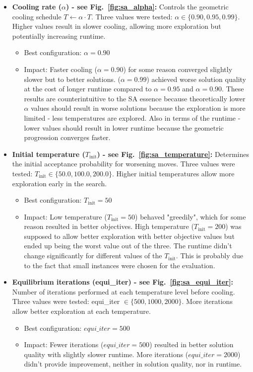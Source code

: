 \documentclass[a4paper]{scrartcl}
\begin{document}
\begin{itemize}
  \item \textbf{Cooling rate ($\alpha$) - see Fig.~\ref{fig:sa_alpha}:} Controls the geometric cooling schedule $T \leftarrow \alpha \cdot T$. Three values were tested: $\alpha \in \{0.90, 0.95, 0.99\}$. Higher values result in slower cooling, allowing more exploration but potentially increasing runtime.
  \begin{itemize}
      \item Best configuration: $\alpha = 0.90$
      \item Impact: Faster cooling ($\alpha = 0.90$) for some reason converged slightly slower but to better solutions. ($\alpha = 0.99$) achieved worse solution quality at the cost of longer runtime compared to $\alpha = 0.95$ and $\alpha = 0.90$. These results are counterintuitive to the SA essence because theoretically lower $\alpha$ values should result in worse solutions because the exploration is more limited - less temperatures are explored. Also in terms of the runtime - lower values should result in lower runtime because the geometric progression converges faster.
  \end{itemize}

  \item \textbf{Initial temperature ($T_{\text{init}}$) - see Fig.~\ref{fig:sa_temperature}:} Determines the initial acceptance probability for worsening moves. Three values were tested: $T_{\text{init}} \in \{50.0, 100.0, 200.0\}$. Higher initial temperatures allow more exploration early in the search.
  \begin{itemize}
      \item Best configuration: $T_{\text{init}} = 50$
      \item Impact: Low temperature ($T_{\text{init}} = 50$) behaved "greedily", which for some reason resulted in better objectives. High temperature ($T_{\text{init}} = 200$) was supposed to allow better exploration with better objective values but ended up being the worst value out of the three. The runtime didn't change significantly for different values of the $T_{\text{init}}$. This is probably due to the fact that small instances were chosen for the evaluation.
  \end{itemize}

  \item \textbf{Equilibrium iterations (equi\_iter) - see Fig.~\ref{fig:sa_equi_iter}:} Number of iterations performed at each temperature level before cooling. Three values were tested: equi\_iter $\in \{500, 1000, 2000\}$. More iterations allow better exploration
at each temperature.
  \begin{itemize}
      \item Best configuration: $equi\_iter = 500$
      \item Impact: Fewer iterations ($equi\_iter = 500$) resulted in better solution quality with slightly slower runtime. More iterations ($equi\_iter = 2000$) didn't provide improvement, neither in solution quality, nor in runtime.
  \end{itemize}
\end{itemize}
\end{document}
